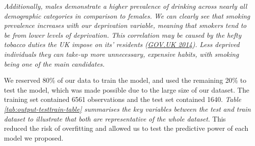 \documentclass[
  11pt,
  twocolumn]{article}
\begin{document}
\emph{Additionally, males demonstrate a higher prevalence of drinking
across nearly all demographic categories in comparison to females.}
\emph{We can clearly see that smoking prevalence increases with our
deprivation variable, meaning that smokers tend to be from lower levels
of deprivation. This correlation may be caused by the hefty tobacco
duties the UK impose on its' residents
(\protect\hyperlink{ref-GovUK}{GOV.UK 2014}). Less deprived individuals
they can take-up more unnecessary, expensive habits, with smoking being
one of the main candidates.}

We reserved 80\% of our data to train the model, and used the remaining
20\% to test the model, which was made possible due to the large size of
our dataset. The training set contained 6561 observations and the test
set contained 1640. \emph{Table \ref{tab:output-testtrain-table}
summarises the key variables between the test and train dataset to
illustrate that both are representative of the whole dataset.} This
reduced the risk of overfitting and allowed us to test the predictive
power of each model we proposed.
\end{document}
